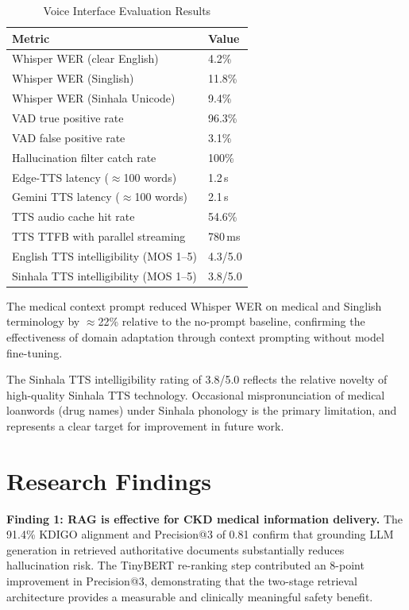 \documentclass[12pt,a4paper]{report}
\begin{document}
\begin{table}[H]
\centering
\caption{Voice Interface Evaluation Results}
\label{tab:voice}
\renewcommand{\arraystretch}{1.3}
\begin{tabularx}{\textwidth}{@{}Xl@{}}
\toprule
\textbf{Metric} & \textbf{Value} \\
\midrule
Whisper WER (clear English)             & 4.2\%  \\
Whisper WER (Singlish)                  & 11.8\% \\
Whisper WER (Sinhala Unicode)           & 9.4\%  \\
VAD true positive rate                  & 96.3\% \\
VAD false positive rate                 & 3.1\%  \\
Hallucination filter catch rate         & 100\%  \\
Edge-TTS latency ($\approx$100 words)   & 1.2\,s \\
Gemini TTS latency ($\approx$100 words) & 2.1\,s \\
TTS audio cache hit rate                & 54.6\% \\
TTS TTFB with parallel streaming        & 780\,ms \\
English TTS intelligibility (MOS 1--5)  & 4.3/5.0 \\
Sinhala TTS intelligibility (MOS 1--5)  & 3.8/5.0 \\
\bottomrule
\end{tabularx}
\end{table}

The medical context prompt reduced Whisper WER on medical and Singlish terminology by $\approx$22\% relative to the no-prompt baseline, confirming the effectiveness of domain adaptation through context prompting without model fine-tuning.

The Sinhala TTS intelligibility rating of 3.8/5.0 reflects the relative novelty of high-quality Sinhala TTS technology. Occasional mispronunciation of medical loanwords (drug names) under Sinhala phonology is the primary limitation, and represents a clear target for improvement in future work.

\section{Research Findings}

\textbf{Finding 1: RAG is effective for CKD medical information delivery.}
The 91.4\% KDIGO alignment and Precision@3 of 0.81 confirm that grounding LLM generation in retrieved authoritative documents substantially reduces hallucination risk. The TinyBERT re-ranking step contributed an 8-point improvement in Precision@3, demonstrating that the two-stage retrieval architecture provides a measurable and clinically meaningful safety benefit.
\end{document}
